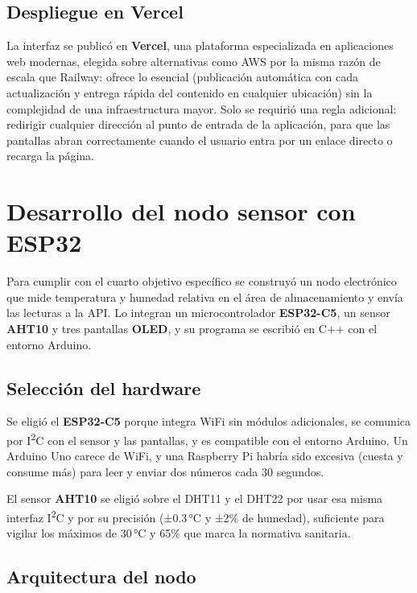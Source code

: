 \subsection{Despliegue en Vercel}

La interfaz se publicó en \textbf{Vercel}, una plataforma especializada en aplicaciones web modernas, elegida sobre alternativas como AWS por la misma razón de escala que Railway: ofrece lo esencial (publicación automática con cada actualización y entrega rápida del contenido en cualquier ubicación) sin la complejidad de una infraestructura mayor. Solo se requirió una regla adicional: redirigir cualquier dirección al punto de entrada de la aplicación, para que las pantallas abran correctamente cuando el usuario entra por un enlace directo o recarga la página.


\clearpage
\section{Desarrollo del nodo sensor con ESP32}

Para cumplir con el cuarto objetivo específico se construyó un nodo electrónico que mide temperatura y humedad relativa en el área de almacenamiento y envía las lecturas a la API. Lo integran un microcontrolador \textbf{ESP32-C5}, un sensor \textbf{AHT10} y tres pantallas \textbf{OLED}, y su programa se escribió en C++ con el entorno Arduino.

\subsection{Selección del hardware}

Se eligió el \textbf{ESP32-C5} porque integra WiFi sin módulos adicionales, se comunica por I\textsuperscript{2}C con el sensor y las pantallas, y es compatible con el entorno Arduino. Un Arduino Uno carece de WiFi, y una Raspberry Pi habría sido excesiva (cuesta y consume más) para leer y enviar dos números cada 30 segundos.

El sensor \textbf{AHT10} se eligió sobre el DHT11 y el DHT22 por usar esa misma interfaz I\textsuperscript{2}C y por su precisión (±0.3\,°C y ±2\% de humedad), suficiente para vigilar los máximos de 30\,°C y 65\% que marca la normativa sanitaria.

\subsection{Arquitectura del nodo}


